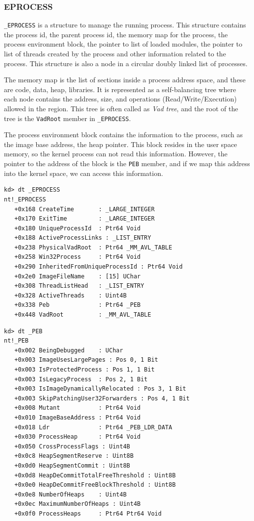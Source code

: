 \subsubsection[EPROCESS]{EPROCESS}

\texttt{\_EPROCESS} is a structure to manage the running process. This
structure contains the process id, the parent process id, the memory map for
the process, the process environment block, the pointer to list of loaded
modules, the pointer to list of threads created by the process and other
information related to the process.  This structure is also a node in a
circular doubly linked list of processes.

The memory map is the list of sections inside a process address space, and
these are code, data, heap, libraries. It is represented as a self-balancing
tree where each node contains the address, size, and operations
(Read/Write/Execution) allowed in the region. This tree is often called as
\textit{Vad tree}, and the root of the tree is the \texttt{VadRoot} member in
\texttt{\_EPROCESS}.

The process environment block contains the information to the process, such as
the image base address, the heap pointer. This block resides in the user space
memory, so the kernel process can not read this information. However, the
pointer to the address of the block is the \texttt{PEB} member, and if we map
this address into the kernel space, we can access this information.

\begin{lstlisting}[language=windbg,caption=\texttt{\_EPROCESS} in Windows 7,float,floatplacement=H]
kd> dt _EPROCESS
nt!_EPROCESS
   +0x168 CreateTime       : _LARGE_INTEGER
   +0x170 ExitTime         : _LARGE_INTEGER
   +0x180 UniqueProcessId  : Ptr64 Void
   +0x188 ActiveProcessLinks : _LIST_ENTRY
   +0x238 PhysicalVadRoot  : Ptr64 _MM_AVL_TABLE
   +0x258 Win32Process     : Ptr64 Void
   +0x290 InheritedFromUniqueProcessId : Ptr64 Void
   +0x2e0 ImageFileName    : [15] UChar
   +0x308 ThreadListHead   : _LIST_ENTRY
   +0x328 ActiveThreads    : Uint4B
   +0x338 Peb              : Ptr64 _PEB
   +0x448 VadRoot          : _MM_AVL_TABLE
\end{lstlisting}

\begin{lstlisting}[language=windbg,caption=\texttt{\_PEB} in Windows 7,float,floatplacement=H]
kd> dt _PEB
nt!_PEB
   +0x002 BeingDebugged    : UChar
   +0x003 ImageUsesLargePages : Pos 0, 1 Bit
   +0x003 IsProtectedProcess : Pos 1, 1 Bit
   +0x003 IsLegacyProcess  : Pos 2, 1 Bit
   +0x003 IsImageDynamicallyRelocated : Pos 3, 1 Bit
   +0x003 SkipPatchingUser32Forwarders : Pos 4, 1 Bit
   +0x008 Mutant           : Ptr64 Void
   +0x010 ImageBaseAddress : Ptr64 Void
   +0x018 Ldr              : Ptr64 _PEB_LDR_DATA
   +0x030 ProcessHeap      : Ptr64 Void
   +0x050 CrossProcessFlags : Uint4B
   +0x0c8 HeapSegmentReserve : Uint8B
   +0x0d0 HeapSegmentCommit : Uint8B
   +0x0d8 HeapDeCommitTotalFreeThreshold : Uint8B
   +0x0e0 HeapDeCommitFreeBlockThreshold : Uint8B
   +0x0e8 NumberOfHeaps    : Uint4B
   +0x0ec MaximumNumberOfHeaps : Uint4B
   +0x0f0 ProcessHeaps     : Ptr64 Ptr64 Void
\end{lstlisting}

